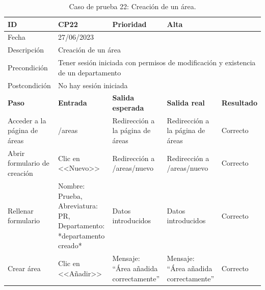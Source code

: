 \begin{table}[H]
\begin{tabular}{p{} p{} p{} p{} p{}}
\cellcolor{gray!25}
ID   & CP22 & \cellcolor{gray!25} Prioridad   & Alta \\ \hline
\cellcolor{gray!25} Fecha	&	\multicolumn{4}{l}{27/06/2023} \\ \hline
\cellcolor{gray!25} Descripción		&	\multicolumn{4}{l}{Creación de un área} \\ \hline                                            
\cellcolor{gray!25}
Precondición  & \multicolumn{4}{p{.66\textwidth}}{Tener sesión iniciada con permisos de modificación y existencia de un departamento} \\ \hline
\cellcolor{gray!25} Postcondición & \multicolumn{4}{l}{No hay sesión iniciada}                                                    \\ \hline
\rowcolor{gray!25}
\textbf{Paso}   & \textbf{Entrada} & \textbf{Salida esperada} & \textbf{Salida real} & \textbf{Resultado} \\ \hline
Acceder a la página de áreas
& /areas                                                                          
& Redirección a la página de áreas
& Redirección a la página de áreas
& Correcto                            
\\ \hline
Abrir formulario de creación
& Clic en <<Nuevo>>
& Redirección a /areas/nuevo
& Redirección a /areas/nuevo
& Correcto
\\ \hline
Rellenar formulario
& Nombre: Prueba, Abreviatura: PR, Departamento: *departamento creado*
& Datos introducidos                     
& Datos introducidos 
& Correcto                            
\\ \hline  
Crear área
& Clic en <<Añadir>>
& Mensaje: ``Área añadida correctamente''                     
& Mensaje: ``Área añadida correctamente''  
& Correcto                            
\\ \hline              
\end{tabular}
\caption{Caso de prueba 22: Creación de un área.}
\end{table}


